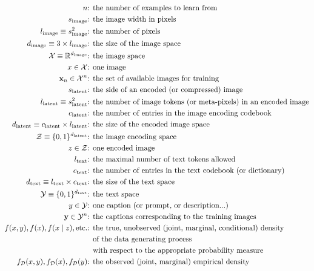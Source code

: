 \documentclass{article}
\begin{document}
$$
\begin{aligned}
n & \text{: the number of examples to learn from} \\
\si & \text{: the image width in pixels} \\
\li \equiv s_{\text{image}}^2 & \text{: the number of pixels} \\
\di \equiv3\times l_{\text{image}} & \text{: the size of the image space} \\
\mathcal{X}\equiv \mathbb{R}^{d_{\text{image}}} & \text{: the image space} \\
x \in \mathcal{X} & \text{: one image} \\
\xn \in \mathcal{X}^n & \text{: the set of available images for training} \\
s_\text{latent} & \text{: the side of an encoded (or compressed) image} \\
\llat\equiv s_\text{latent}^2 & \text{: the number of image tokens (or meta-pixels) in an encoded image} \\
c_\text{latent} & \text{: the number of entries in the image encoding codebook} \\
d_\text{latent} \equiv c_\text{latent} \times l_\text{latent} & \text{: the size of the encoded image space} \\
\mathcal{Z}\equiv\{0,1\}^{d_\text{latent}} & \text{: the image encoding space} \\
z \in \mathcal{Z} & \text{: one encoded image} \\
\lt & \text{: the maximal number of text tokens allowed} \\
\ct & \text{: the number of entries in the text codebook (or dictionary)} \\
\dt \equiv \lt \times \ct & \text{: the size of the text space} \\
\mathcal{Y}\equiv \{0,1\}^{\dt} & \text{: the text space} \\
y \in \mathcal{Y} & \text{: one caption (or prompt, or description...)} \\
\mathbf{y} \in \mathcal{Y}^n & \text{: the captions corresponding to the training images} \\
f(x,y), f(x), f(x \mid z), \text{etc.} & \text{: the true, unobserved (joint, marginal, conditional) density} \\
& \phantom{\text{: }}\text{of the data generating process} \\
& \phantom{\text{: }}\text{with respect to the appropriate probability measure} \\
\fd(x,y), \fd(x), \fd(y) & \text{: the observed (joint, marginal) empirical density}
\end{aligned}
$$
\end{document}
